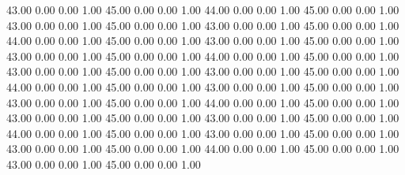    43.00   0.00   0.00   1.00
   45.00   0.00   0.00   1.00
   44.00   0.00   0.00   1.00
   45.00   0.00   0.00   1.00
   43.00   0.00   0.00   1.00
   45.00   0.00   0.00   1.00
   43.00   0.00   0.00   1.00
   45.00   0.00   0.00   1.00
   44.00   0.00   0.00   1.00
   45.00   0.00   0.00   1.00
   43.00   0.00   0.00   1.00
   45.00   0.00   0.00   1.00
   43.00   0.00   0.00   1.00
   45.00   0.00   0.00   1.00
   44.00   0.00   0.00   1.00
   45.00   0.00   0.00   1.00
   43.00   0.00   0.00   1.00
   45.00   0.00   0.00   1.00
   43.00   0.00   0.00   1.00
   45.00   0.00   0.00   1.00
   44.00   0.00   0.00   1.00
   45.00   0.00   0.00   1.00
   43.00   0.00   0.00   1.00
   45.00   0.00   0.00   1.00
   43.00   0.00   0.00   1.00
   45.00   0.00   0.00   1.00
   44.00   0.00   0.00   1.00
   45.00   0.00   0.00   1.00
   43.00   0.00   0.00   1.00
   45.00   0.00   0.00   1.00
   43.00   0.00   0.00   1.00
   45.00   0.00   0.00   1.00
   44.00   0.00   0.00   1.00
   45.00   0.00   0.00   1.00
   43.00   0.00   0.00   1.00
   45.00   0.00   0.00   1.00
   43.00   0.00   0.00   1.00
   45.00   0.00   0.00   1.00
   44.00   0.00   0.00   1.00
   45.00   0.00   0.00   1.00
   43.00   0.00   0.00   1.00
   45.00   0.00   0.00   1.00